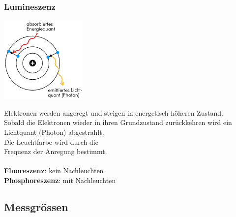 \subsubsection{Lumineszenz}

\begin{minipage}{0.3\linewidth}
\includegraphics[width=\linewidth]{Bilder/Wellen-Optik/lumineszenz}
\end{minipage}
\hfill
\begin{minipage}{0.58\linewidth}
Elektronen werden angeregt und steigen in energetisch höheren Zustand. \\
Sobald die Elektronen wieder in ihren Grundzustand zurückkehren wird ein Lichtquant (Photon) abgestrahlt. \\
Die Leuchtfarbe wird durch die \\
Frequenz der Anregung bestimmt. \\
\\
\textbf{Fluoreszenz}: kein Nachleuchten \\
\textbf{Phosphoreszenz}: mit Nachleuchten \\
\end{minipage}




\subsection{Messgrössen}

